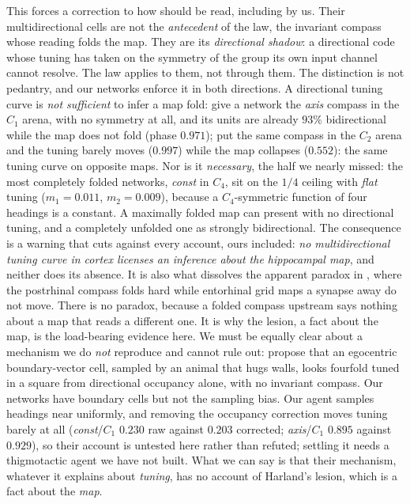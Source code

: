 This forces a correction to how \citet{zhang2022} should be read, including by us. Their
multidirectional cells are not the \emph{antecedent} of the law, the invariant compass whose reading
folds the map. They are its \emph{directional shadow}: a directional code whose tuning has taken on the
symmetry of the group its own input channel cannot resolve. The law applies to them, not through them.
The distinction is not pedantry, and our networks enforce it in both directions. A directional tuning
curve is \emph{not sufficient} to infer a map fold: give a network the \textit{axis} compass in the
$C_1$ arena, with no symmetry at all, and its units are already $93\%$ bidirectional while the map does
not fold (phase $0.971$); put the same compass in the $C_2$ arena and the tuning barely moves ($0.997$)
while the map collapses ($0.552$): the same tuning curve on opposite maps. Nor is it \emph{necessary},
the half we nearly missed: the most completely folded networks, \textit{const} in $C_4$, sit on the
$1/4$ ceiling with \emph{flat} tuning ($m_1 = 0.011$, $m_2 = 0.009$), because a $C_4$-symmetric function
of four headings is a constant. A maximally folded map can present with no directional tuning, and a
completely unfolded one as strongly bidirectional. The consequence is a warning that cuts against every
account, ours included: \emph{no multidirectional tuning curve in cortex licenses an inference about the
hippocampal map}, and neither does its absence. It is also what dissolves the apparent paradox in
\citet{lachance2024}, where the postrhinal compass folds hard while entorhinal grid maps a synapse away
do not move. There is no paradox, because a folded compass upstream says nothing about a map that
reads a different one. It is why the lesion, a fact about the map, is the load-bearing evidence here.
We must be equally clear about a mechanism we do \emph{not} reproduce and cannot rule out:
\citet{alexander2020} propose that an egocentric boundary-vector cell, sampled by an animal that hugs
walls, looks fourfold tuned in a square from directional occupancy alone, with no invariant compass.
Our networks have boundary cells but not the sampling bias. Our agent samples headings near uniformly,
and removing the occupancy correction moves tuning barely at all (\textit{const}/$C_1$ $0.230$ raw
against $0.203$ corrected; \textit{axis}/$C_1$ $0.895$ against $0.929$), so their account is untested
here rather than refuted; settling it needs a thigmotactic agent we have not built. What we
can say is that their mechanism, whatever it explains about \emph{tuning}, has no account of Harland's
lesion, which is a fact about the \emph{map}.

